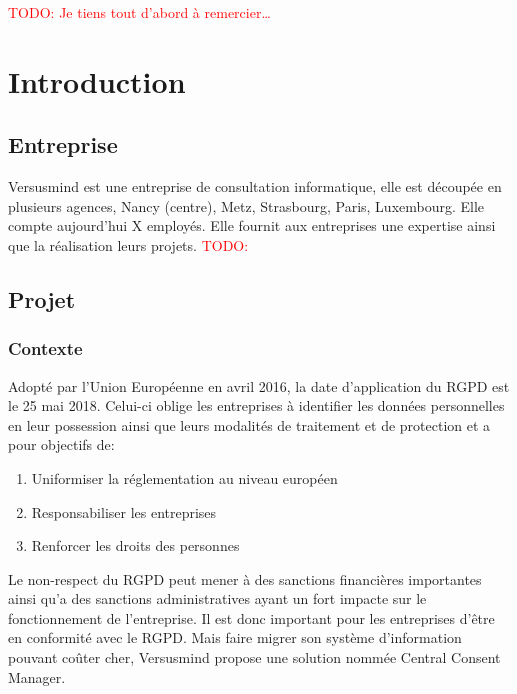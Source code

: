 \documentclass[12pt, a4paper]{report}
\makeatletter
\newcommand\tab[1][1cm]{\hspace*{#1}}
\newcommand\TODO[1]{\textcolor{red}{TODO\@: #1}}
\makeatother
\begin{document}
	\makeutbmfrontcover{}
        \TODO{Je tiens tout d'abord à remercier\ldots}
    \newpage
    \tableofcontents
    \chapter{Introduction}
        \section{Entreprise}
            \tab{} Versusmind est une entreprise de consultation informatique, elle est découpée en plusieurs agences, Nancy (centre), Metz, Strasbourg, Paris, Luxembourg.\newline
            Elle compte aujourd'hui X employés. Elle fournit aux entreprises une expertise ainsi que la réalisation leurs projets.
            \TODO{}
        \section{Projet}
            \subsection{Contexte}
                \tab{} Adopté par l’Union Européenne en avril 2016, la date d’application du RGPD est le 25 mai 2018. Celui-ci oblige les entreprises à identifier les données personnelles en leur possession ainsi que leurs modalités de traitement et de protection et a pour objectifs de\@:
                \begin{enumerate}
                    \item Uniformiser la réglementation au niveau européen
                    \item Responsabiliser les entreprises
                    \item Renforcer les droits des personnes
                \end{enumerate}
                \tab{} Le non-respect du RGPD peut mener à des sanctions financières importantes ainsi qu'a des sanctions administratives ayant un fort impacte sur le fonctionnement de l'entreprise.
                Il est donc important pour les entreprises d'être en conformité avec le RGPD.\newline
                Mais faire migrer son système d'information pouvant coûter cher, Versusmind propose une solution nommée Central Consent Manager.
\end{document}
